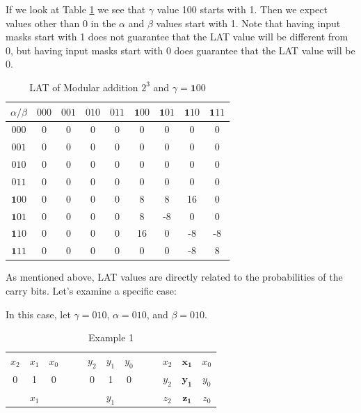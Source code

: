 \documentclass[runningheads]{llncs}
\begin{document}
If we look at Table \ref{tab:LAT100} we see that $\gamma$ value 100 starts with 1. Then we expect values other than 0 in the $\alpha$ and $\beta$ values start with 1. Note that having input masks start with 1 does not guarantee that the LAT value will be different from 0, but having input masks start with 0 does guarantee that the LAT value will be 0.
  

\begin{table}[]
    \centering
    \begin{tabular}{c|cccccccc}
    $ \alpha / \beta $ & $000$ & $001$ & $010$ & $011$ & $\textbf{1}00$ & $\textbf{1}01$ & $\textbf{1}10$ & $\textbf{1}11$  \\
    \midrule
    $000$ & 0 & 0 & 0 & 0 & 0 & 0 & 0 & 0  \\
    $001$ & 0 & 0 & 0 & 0 & 0 & 0 & 0 & 0  \\
    $010$ & 0 & 0 & 0 & 0 & 0 & 0 & 0 & 0  \\
    $011$ & 0 & 0 & 0 & 0 & 0 & 0 & 0 & 0  \\
    $\textbf{1}00$ & 0 & 0 & 0 & 0 & 8 & 8 & 16 & 0  \\
    $\textbf{1}01$ & 0 & 0 & 0 & 0 & 8 & -8 & 0 & 0  \\
    $\textbf{1}10$ & 0 & 0 & 0 & 0 & 16 & 0 & -8 & -8  \\
    $\textbf{1}11$ & 0 & 0 & 0 & 0 & 0 & 0 & -8 & 8  \\
    \end{tabular}
    \caption{LAT of Modular addition $2^3$ and $\gamma = \textbf{1}0 0$}
    \label{tab:LAT100}
\end{table}
    
As mentioned above, LAT values are directly related to the probabilities of the carry bits. Let’s examine a specific case:

In this case, let \( \gamma = 010 \), \( \alpha = 010 \), and \( \beta = 010 \).

\begin{table}[H]
    \centering
    \begin{tabular}{cccc | ccccc | cccc}
    $x_2$ & $x_1$ & $x_0$ &  &  & $y_2$ & $y_1$ & $y_0$ &  &  & $x_2$ & $\pmb{x_1}$ & $x_0$ \\
     0     & 1     & 0     &  &  & 0     & 1     & 0     &  &  & $y_2$ & $\pmb{y_1}$ & $y_0$ \\
    \hline
          & $x_1$ &       &  &  &       & $y_1$ &       &  &  & $z_2$ & $\pmb{z_1}$ & $z_0$
    \end{tabular}
    \caption{Example 1}
    \label{tab:ex1}
\end{table}
\end{document}
